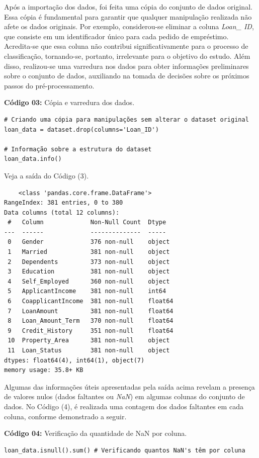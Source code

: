 \documentclass[a4paper,12pt]{article} %
\begin{document}
Após a importação dos dados, foi feita uma cópia do conjunto de dados original. Essa cópia é fundamental para garantir que qualquer manipulação realizada não afete os dados originais. Por exemplo, considerou-se eliminar a coluna \textit{Loan\_ ID}, que consiste em um identificador único para cada pedido de empréstimo. Acredita-se que essa coluna não contribui significativamente para o processo de classificação, tornando-se, portanto, irrelevante para o objetivo do estudo. Além disso, realizou-se uma varredura nos dados para obter informações preliminares sobre o conjunto de dados, auxiliando na tomada de decisões sobre os próximos passos do pré-processamento.
\begin{center}
\textbf{Código 03:} Cópia e varredura dos dados. 
\begin{verbatim}
# Criando uma cópia para manipulações sem alterar o dataset original
loan_data = dataset.drop(columns='Loan_ID')

# Informação sobre a estrutura do dataset
loan_data.info()
\end{verbatim}
\end{center}

Veja a saída do Código (3).
\begin{verbatim}
    <class 'pandas.core.frame.DataFrame'>
RangeIndex: 381 entries, 0 to 380
Data columns (total 12 columns):
 #   Column             Non-Null Count  Dtype  
---  ------             --------------  -----  
 0   Gender             376 non-null    object 
 1   Married            381 non-null    object 
 2   Dependents         373 non-null    object 
 3   Education          381 non-null    object 
 4   Self_Employed      360 non-null    object 
 5   ApplicantIncome    381 non-null    int64  
 6   CoapplicantIncome  381 non-null    float64
 7   LoanAmount         381 non-null    float64
 8   Loan_Amount_Term   370 non-null    float64
 9   Credit_History     351 non-null    float64
 10  Property_Area      381 non-null    object 
 11  Loan_Status        381 non-null    object 
dtypes: float64(4), int64(1), object(7)
memory usage: 35.8+ KB
\end{verbatim}

Algumas das informações úteis apresentadas pela saída acima revelam a presença de valores nulos (dados faltantes ou \textit{NaN}) em algumas colunas do conjunto de dados. No Código (4), é realizada uma contagem dos dados faltantes em cada coluna, conforme demonstrado a seguir.
\begin{center}
\textbf{Código 04:} Verificação da quantidade de NaN por coluna.
\begin{verbatim}
loan_data.isnull().sum() # Verificando quantos NaN's têm por coluna
\end{verbatim}
\end{center}
\end{document}
